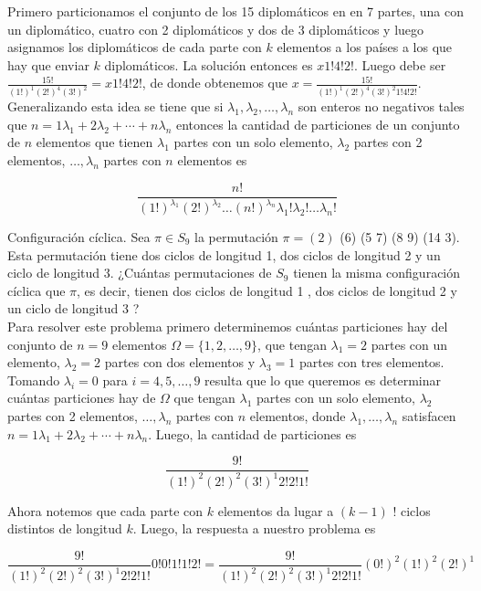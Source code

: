 \documentclass[10pt]{article}
\begin{document}
Primero particionamos el conjunto de los 15 diplomáticos en en 7 partes, una con un diplomático, cuatro con 2 diplomáticos y dos de 3 diplomáticos y luego asignamos los diplomáticos de cada parte con $k$ elementos a los países a los que hay que enviar $k$ diplomáticos. La solución entonces es $x 1!4!2!$. Luego debe ser $\frac{15!}{(1!)^{1}(2!)^{4}(3!)^{2}}=x 1!4!2!$, de donde obtenemos que $x=\frac{15!}{(1!)^{1}(2!)^{4}(3!)^{2} 1!4!2!}$.\\
Generalizando esta idea se tiene que si $\lambda_{1}, \lambda_{2}, \ldots, \lambda_{n}$ son enteros no negativos tales que $n=1 \lambda_{1}+2 \lambda_{2}+\cdots+n \lambda_{n}$ entonces la cantidad de particiones de un conjunto de $n$ elementos que tienen $\lambda_{1}$ partes con un solo elemento, $\lambda_{2}$ partes con 2 elementos, $\ldots, \lambda_{n}$ partes con $n$ elementos es

$$
\frac{n!}{(1!)^{\lambda_{1}}(2!)^{\lambda_{2}} \ldots(n!)^{\lambda_{n}} \lambda_{1}!\lambda_{2}!\ldots \lambda_{n}!}
$$

Configuración cíclica. Sea $\pi \in S_{9}$ la permutación $\pi=(2)$ (6) (5 7) (8 9) (14 3). Esta permutación tiene dos ciclos de longitud 1, dos ciclos de longitud 2 y un ciclo de longitud 3. ¿Cuántas permutaciones de $S_{9}$ tienen la misma configuración cíclica que $\pi$, es decir, tienen dos ciclos de longitud 1 , dos ciclos de longitud 2 y un ciclo de longitud 3 ?\\
Para resolver este problema primero determinemos cuántas particiones hay del conjunto de $n=9$ elementos $\Omega=\{1,2, \ldots, 9\}$, que tengan $\lambda_{1}=2$ partes con un elemento, $\lambda_{2}=2$ partes con dos elementos y $\lambda_{3}=1$ partes con tres elementos. Tomando $\lambda_{i}=0$ para $i=4,5, \ldots, 9$ resulta que lo que queremos es determinar cuántas particiones hay de $\Omega$ que tengan $\lambda_{1}$ partes con un solo elemento, $\lambda_{2}$ partes con 2 elementos, $\ldots, \lambda_{n}$ partes con $n$ elementos, donde $\lambda_{1}, \ldots, \lambda_{n}$ satisfacen $n=1 \lambda_{1}+2 \lambda_{2}+\cdots+n \lambda_{n}$. Luego, la cantidad de particiones es

$$
\frac{9!}{(1!)^{2}(2!)^{2}(3!)^{1} 2!2!1!}
$$

Ahora notemos que cada parte con $k$ elementos da lugar a $(k-1)$ ! ciclos distintos de longitud $k$. Luego, la respuesta a nuestro problema es

$$
\frac{9!}{(1!)^{2}(2!)^{2}(3!)^{1} 2!2!1!} 0!0!1!1!2!=\frac{9!}{(1!)^{2}(2!)^{2}(3!)^{1} 2!2!1!}(0!)^{2}(1!)^{2}(2!)^{1}
$$
\end{document}
